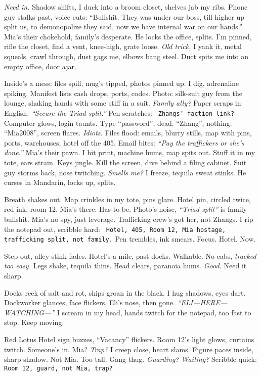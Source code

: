 \documentclass[12pt]{article}
\newcommand{\note}[1]{\texttt{\small \color{DarkGray} #1}}
\begin{document}
\textit{Need in.} Shadow shifts, I duck into a broom closet, shelves jab my ribs. Phone guy stalks past, voice cuts: “Bullshit. They was under our boss, till higher up split us, to demonopolize they said, now we have internal war on our hands.” \textnormal{Mia}’s their chokehold, family’s desperate. He locks the office, splits. I’m pinned, rifle the closet, find a vent, knee-high, grate loose. \textit{Old trick,} I yank it, metal squeals, crawl through, dust gags me, elbows bang steel. Duct spits me into an empty office, door ajar.

Inside’s a mess: files spill, mug’s tipped, photos pinned up. I dig, adrenaline spiking. Manifest lists cash drops, ports, codes. Photo: silk-suit guy from the lounge, shaking hands with some stiff in a suit. \textit{Family ally?} Paper scraps in English: \textit{“Secure the Triad split.”} Pen scratches: \note{Zhangs’ faction link?} Computer glows, login taunts. Type “password”, dead. “Zhang”, nothing. “Mia2008”, screen flares. \textit{Idiots.} Files flood: emails, blurry stills, map with pins, ports, warehouses, hotel off the 405. Email bites: \textit{“Pay the traffickers or she’s done.”} \textnormal{Mia}’s their pawn. I hit print, machine hums, map spits out. Stuff it in my tote, ears strain. Keys jingle. Kill the screen, dive behind a filing cabinet. Suit guy storms back, nose twitching. \textit{Smells me?} I freeze, tequila sweat stinks. He curses in Mandarin, locks up, splits.

Breath shakes out. Map crinkles in my tote, pins glare. Hotel pin, circled twice, red ink, room 12. \textnormal{Mia}’s there. Has to be. Photo’s noise, \textit{“Triad split”} is family bullshit. \textnormal{Mia}’s no spy, just leverage. Trafficking crew’s got her, not Zhangs. I rip the notepad out, scribble hard: \note{Hotel, 405, Room 12, Mia hostage, trafficking split, not family.} Pen trembles, ink smears. Focus. Hotel. Now.

Step out, alley stink fades. Hotel’s a mile, past docks. Walkable. No cabs, \textit{tracked too easy.} Legs shake, tequila thins. Head clears, paranoia hums. \textit{Good.} Need it sharp.

Docks reek of salt and rot, ships groan in the black. I hug shadows, eyes dart. Dockworker glances, face flickers, \textnormal{Eli}’s nose, then gone. \textit{“ELI—HERE—WATCHING—”} I scream in my head, hands twitch for the notepad, too fast to stop. Keep moving.

Red Lotus Hotel sign buzzes, “Vacancy” flickers. Room 12’s light glows, curtains twitch. Someone’s in. \textnormal{Mia}? \textit{Trap?} I creep close, heart slams. Figure paces inside, sharp shadow. Not \textnormal{Mia}. Too tall. Gang thug. \textit{Guarding? Waiting?} Scribble quick: \note{Room 12, guard, not Mia, trap?}
\end{document}
